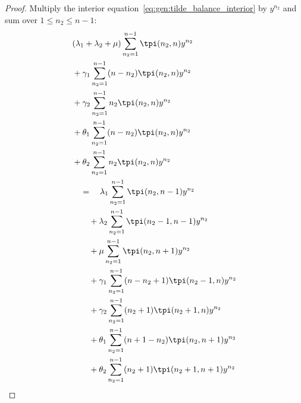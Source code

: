 \begin{proof}
    Multiply the interior equation~\eqref{eq:gen:tilde_balance_interior} by $y^{n_2}$ and sum over $1\le n_2\le n-1$:
    \begin{align*}
        \begin{split}
            & (\lambda_1+\lambda_2+\mu) \sum_{n_2=1}^{n-1} \tpi(n_2,n) y^{n_2} \\
            & + \gamma_1 \sum_{n_2=1}^{n-1} (n-n_2) \tpi(n_2,n) y^{n_2} \\
            & + \gamma_2 \sum_{n_2=1}^{n-1} n_2 \tpi(n_2,n) y^{n_2} \\
            & + \theta_1 \sum_{n_2=1}^{n-1} (n-n_2) \tpi(n_2,n) y^{n_2} \\
            & + \theta_2 \sum_{n_2=1}^{n-1} n_2 \tpi(n_2,n) y^{n_2} \\
            & \quad = \quad \lambda_1 \sum_{n_2=1}^{n-1} \tpi(n_2, n-1) y^{n_2} \\
            & \quad \quad + \lambda_2 \sum_{n_2=1}^{n-1} \tpi(n_2-1, n-1) y^{n_2} \\
            & \quad \quad + \mu \sum_{n_2=1}^{n-1} \tpi(n_2, n+1) y^{n_2} \\
            & \quad \quad + \gamma_1 \sum_{n_2=1}^{n-1} (n-n_2+1) \tpi(n_2-1, n) y^{n_2} \\
            & \quad \quad + \gamma_2 \sum_{n_2=1}^{n-1} (n_2+1) \tpi(n_2+1, n) y^{n_2} \\
            & \quad \quad + \theta_1 \sum_{n_2=1}^{n-1} (n+1-n_2) \tpi(n_2, n+1) y^{n_2} \\
            & \quad \quad + \theta_2 \sum_{n_2=1}^{n-1} (n_2+1) \tpi(n_2+1, n+1) y^{n_2}
        \end{split}
    \end{align*}
    

\end{proof}
